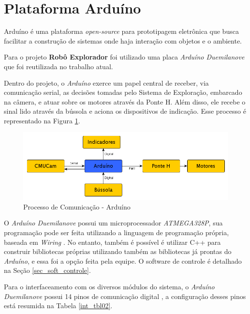 \section{Plataforma Arduíno}
\label{sec_arduino}

Arduíno é uma plataforma \textit{open-source} para prototipagem eletrônica que busca facilitar a construção de sistemas onde haja interação com objetos e o ambiente. \cite{arduino1}

Para o projeto \textbf{Robô Explorador} foi utilizado uma placa \textit{Arduíno Duemilanove} que foi reutilizada no trabalho atual.

Dentro do projeto, o \textit{Arduíno} exerce um papel central de receber, via comunicação serial, as decisões tomadas pelo Sistema de Exploração, embarcado na câmera, e atuar sobre os motores através da Ponte H. Além disso, ele recebe o sinal lido através da bússola e aciona os dispositivos de indicação. Esse processo é representado na Figura \ref{int_fig02}.

\begin{figure}[h!]
    \center
    \includegraphics[scale=0.5]{imagens/processo_arduino.png}
    \caption{Processo de Comunicação - Arduíno}
    \label{int_fig02}
\end{figure}

O \textit{Arduíno Duemilanove} possui um microprocessador \textit{ATMEGA328P}, sua programação pode ser feita utilizando a linguagem de programação própria, baseada em \textit{Wiring} \cite{arduino1}. No entanto, também é possível é utilizar C++ para construir bibliotecas próprias utilizando também as bibliotecas já prontas do \textit{Arduíno}, e essa foi a opção feita pela equipe. O software de controle é detalhado na Seção \ref{sec_soft_controle}.

Para o interfaceamento com os diversos módulos do sistema, o \textit{Arduíno Duemilanove} possui 14 pinos de comunicação digital \cite{arduino2}, a configuração desses pinos está resumida na Tabela \ref{int_tbl02}.

